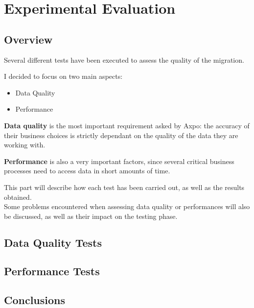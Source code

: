 \part{Experimental Evaluation}
    \chapter*{Overview}
        Several different tests have been executed to assess the quality of the migration.
        
        I decided to focus on two main aspects:
        \begin{itemize}
            \item Data Quality
            \item Performance
        \end{itemize}
        
        \textbf{Data quality} is the most important requirement asked by Axpo: the accuracy of their business choices is strictly dependant on the quality of the data they are working with.
        
        \textbf{Performance} is also a very important factors, since several critical business processes need to access data in short amounts of time.\newline
        
        This part will describe how each test has been carried out, as well as the results obtained.\\
        Some problems encountered when assessing data quality or performances will also be discussed, as well as their impact on the testing phase.
        
    \chapter{Data Quality Tests}
        
    \chapter{Performance Tests}
        
    \chapter{Conclusions}
        